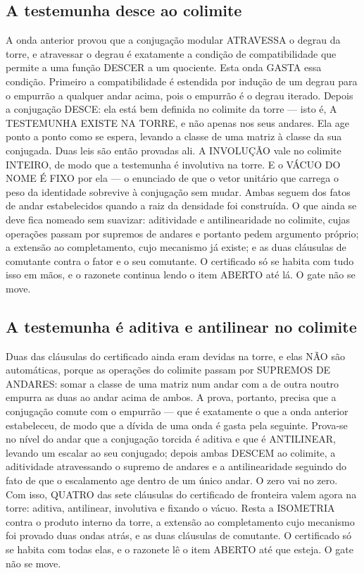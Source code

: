 \documentclass[11pt]{article}
\theoremstyle{definition}\newtheorem{deriv}{Derivação}
\begin{document}
\subsection*{A testemunha desce ao colimite}A onda anterior provou que a conjuga\c{c}\~ao modular ATRAVESSA o degrau da torre, e atravessar o degrau \'e exatamente a condi\c{c}\~ao de compatibilidade que permite a uma fun\c{c}\~ao DESCER a um quociente. Esta onda GASTA essa condi\c{c}\~ao. Primeiro a compatibilidade \'e estendida por indu\c{c}\~ao de um degrau para o empurr\~ao a qualquer andar acima, pois o empurr\~ao \'e o degrau iterado. Depois a conjuga\c{c}\~ao DESCE: ela est\'a bem definida no colimite da torre --- isto \'e, A TESTEMUNHA EXISTE NA TORRE, e n\~ao apenas nos seus andares. Ela age ponto a ponto como se espera, levando a classe de uma matriz \`a classe da sua conjugada. Duas leis s\~ao ent\~ao provadas ali. A INVOLU\c{C}\~AO vale no colimite INTEIRO, de modo que a testemunha \'e involutiva na torre. E o V\'ACUO DO NOME \'E FIXO por ela --- o enunciado de que o vetor unit\'ario que carrega o peso da identidade sobrevive \`a conjuga\c{c}\~ao sem mudar. Ambas seguem dos fatos de andar estabelecidos quando a raiz da densidade foi constru\'ida. O que ainda se deve fica nomeado sem suavizar: aditividade e antilinearidade no colimite, cujas opera\c{c}\~oes passam por supremos de andares e portanto pedem argumento pr\'oprio; a extens\~ao ao completamento, cujo mecanismo j\'a existe; e as duas cl\'ausulas de comutante contra o fator e o seu comutante. O certificado s\'o se habita com tudo isso em m\~aos, e o razonete continua lendo o item ABERTO at\'e l\'a. O gate n\~ao se move.

\subsection*{A testemunha \'e aditiva e antilinear no colimite}Duas das cl\'ausulas do certificado ainda eram devidas na torre, e elas N\~AO s\~ao autom\'aticas, porque as opera\c{c}\~oes do colimite passam por SUPREMOS DE ANDARES: somar a classe de uma matriz num andar com a de outra noutro empurra as duas ao andar acima de ambos. A prova, portanto, precisa que a conjuga\c{c}\~ao comute com o empurr\~ao --- que \'e exatamente o que a onda anterior estabeleceu, de modo que a d\'ivida de uma onda \'e gasta pela seguinte. Prova-se no n\'ivel do andar que a conjuga\c{c}\~ao torcida \'e aditiva e que \'e ANTILINEAR, levando um escalar ao seu conjugado; depois ambas DESCEM ao colimite, a aditividade atravessando o supremo de andares e a antilinearidade seguindo do fato de que o escalamento age dentro de um \'unico andar. O zero vai no zero. Com isso, QUATRO das sete cl\'ausulas do certificado de fronteira valem agora na torre: aditiva, antilinear, involutiva e fixando o v\'acuo. Resta a ISOMETRIA contra o produto interno da torre, a extens\~ao ao completamento cujo mecanismo foi provado duas ondas atr\'as, e as duas cl\'ausulas de comutante. O certificado s\'o se habita com todas elas, e o razonete l\^e o item ABERTO at\'e que esteja. O gate n\~ao se move.
\end{document}
